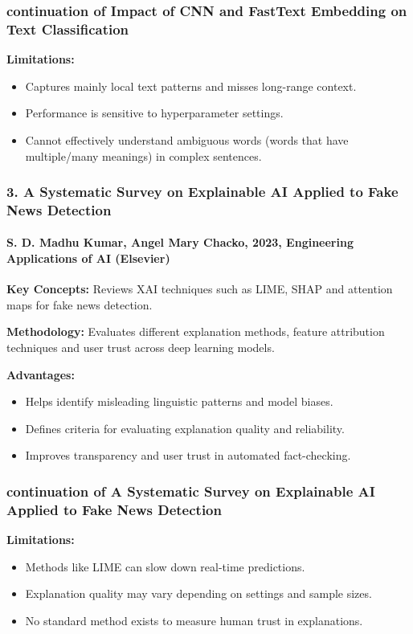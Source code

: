 \documentclass{beamer}
\begin{document}
\begin{frame}
\frametitle{continuation of Impact of CNN and FastText Embedding on Text Classification}
\large{
\textbf{Limitations:}
\begin{itemize}
    \item Captures mainly local text patterns and misses long-range context.
    \item Performance is sensitive to hyperparameter settings.
    \item Cannot effectively understand ambiguous words (words that have multiple/many meanings) in complex sentences.
\end{itemize}
}
\end{frame}

\begin{frame}
\frametitle{3. A Systematic Survey on Explainable AI Applied to Fake News Detection}
\framesubtitle{S. D. Madhu Kumar, Angel Mary Chacko, 2023, Engineering Applications of AI (Elsevier)}
\small{
\textbf{Key Concepts:} Reviews XAI techniques such as LIME, SHAP and attention maps for fake news detection. \par\vspace{0.15cm}
\textbf{Methodology:} Evaluates different explanation methods, feature attribution techniques and user trust across deep learning models. \par\vspace{0.15cm}
\textbf{Advantages:}
\begin{itemize}
    \item Helps identify misleading linguistic patterns and model biases.
    \item Defines criteria for evaluating explanation quality and reliability.
    \item Improves transparency and user trust in automated fact-checking.
\end{itemize}
}
\end{frame}

\begin{frame}
\frametitle{continuation of A Systematic Survey on Explainable AI Applied to Fake News Detection}
\large{
\textbf{Limitations:}
\begin{itemize}
    \item Methods like LIME can slow down real-time predictions.
    \item Explanation quality may vary depending on settings and sample sizes.
    \item No standard method exists to measure human trust in explanations.
\end{itemize}
}
\end{frame}
\end{document}
